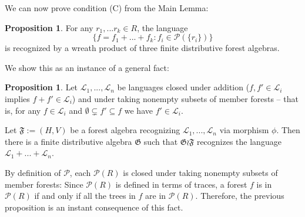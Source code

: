 \documentclass[sigplan,9pt]{acmart}\settopmatter{printfolios=true,printccs=false,printacmref=false}
\newcounter{thm}
\newcounter{theorem}
\theoremstyle{definition}
\newtheorem{prop}[thm]{Proposition}
\newcommand{\La}[0]{{\mathcal{L}}}
\newcommand{\Ff}[0]{{\mathfrak{F}}}
\newcommand{\Gg}[0]{{\mathfrak{G}}}
\newcommand{\Pa}[0]{{\mathcal{P}}}
\begin{document}
We can now prove condition (C) from the Main Lemma:
\begin{prop}
For any $r_1, ... r_k \in R$, the language $$\{f = f_1 + ... + f_k : f_i \in \Pa(\{r_i\})\}$$
is recognized by a wreath product of three finite distributive forest algebras.
\end{prop}

We show this as an instance of a general fact: 

\begin{prop}
Let $\La_1, ..., \La_n$ be languages closed under addition ($f, f' \in \La_i$ implies $f+f' \in \La_i$) and under taking nonempty subsets of member forests -- that is, for any $f \in \La_i$ and $\emptyset \subsetneq f' \subseteq f$ we have $f' \in\La_i$.

Let $\Ff := (H,V)$ be a forest algebra recognizing $\La_1, ..., \La_n$ via morphism $\phi$.
Then there is a finite distributive algebra $\Gg$ such that $\Gg \wr \Ff$ recognizes the language $\La_1 + ... + \La_n$.
\end{prop}

By definition of $\Pa$, each $\Pa(R)$ is closed under taking nonempty subsets of member forests: Since $\Pa(R)$ is defined in terms of traces, a forest $f$ is in $\Pa(R)$ if and only if all the trees in $f$ are in $\Pa(R)$.
Therefore, the previous proposition is an instant consequence of this fact.
\end{document}

